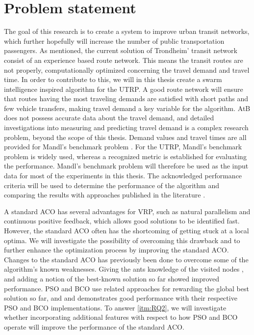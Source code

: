 \section{Problem statement}
\label{subsec:problemStatement}

The goal of this research is to create a system to improve urban transit networks, which further hopefully will increase the number of public transportation passengers. As mentioned, the current solution of Trondheim' transit network consist of an experience based route network. This means the transit routes are not properly, computationally optimized concerning the travel demand and travel time. In order to contribute to this, we will in this thesis create a swarm intelligence inspired algorithm for the UTRP. A good route network will ensure that routes having the most traveling demands are satisfied with short paths and few vehicle transfers, making travel demand a key variable for the algorithm. AtB \citep{website:atb} does not possess accurate data about the travel demand, and detailed investigations into measuring and predicting travel demand is a complex research problem, beyond the scope of this thesis. Demand values and travel times are all provided for Mandl's benchmark problem \citep{mandl79}. For the UTRP, Mandl's benchmark problem is widely used, whereas a recognized metric is established for evaluating the performance. Mandl's benchmark problem will therefore be used as the input data for most of the experiments in this thesis. The acknowledged performance criteria will be used to determine the performance of the algorithm and comparing the results with approaches published in the literature \citep{nikolic14,kechagiopoulos14,mandl79,kidwai98, fan10, chakroborty02, zhang10, chew12}.

A standard ACO has several advantages for VRP, such as natural parallelism and continuous positive feedback, which allows good solutions to be identified fast. However, the standard ACO often has the shortcoming  of getting stuck at a local optima. We will investigate the possibility of overcoming this drawback and to further enhance the optimization process by improving the standard ACO. Changes to the standard ACO has previously been done to overcome some of the algorithm's known weaknesses. Giving the ants knowledge of the visited nodes \citep{sedighpour14,salehinejad10,poorzahedy11}, and adding a notion of the best-known solution so far \citep{tripathi09,sedighpour14} showed improved performance. PSO and BCO use related approaches for rewarding the global best solution so far, and \citet{kechagiopoulos14} and \citet{nikolic14} demonstrates good performance with their respective PSO and BCO implementations. To answer \vref{itm:RQ2}, we will investigate whether incorporating additional features with respect to how PSO and BCO operate will improve the performance of the standard ACO.

